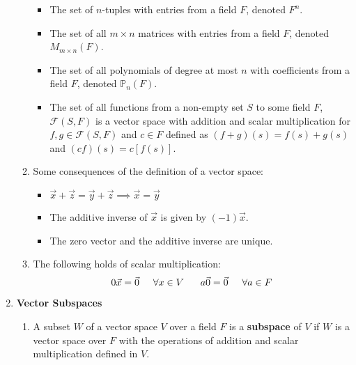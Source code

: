 \documentclass[10pt]{article}
\begin{document}
\begin{multicols*}{2}
\begin{enumerate}
\begin{enumerate}
\begin{itemize}
             \item The set of $n$-tuples with entries from a field $F$, denoted $F^n$.
             
             \item The set of all $m \times n$ matrices with entries from a field $F$, denoted $M_{m \times n} (F)$.
             
             \item The set of all polynomials of degree at most $n$ with coefficients from a field $F$, denoted $\mathbb{P}_n(F)$. 
             
             \item The set of all functions from a non-empty set $S$ to some field $F$, $\mathcal{F}(S,F)$ is a vector space with addition and scalar multiplication for $f,g \in \mathcal{F}(S,F)$ and $c \in F$ defined as $(f+g)(s) = f(s) + g(s)$ and $(cf)(s) = c[f(s)]$.
         \end{itemize}
         
         \item Some consequences of the definition of a vector space:
         \begin{itemize}
             \item $\vec{x} + \vec{z} = \vec{y} + \vec{z} \implies \vec{x} = \vec{y}$
             \item The additive inverse of $\vec{x}$ is given by $(-1)\vec{x}$.
             \item The zero vector and the additive inverse are unique.
         \end{itemize}
         \item The following holds of scalar multiplication: $$0\vec{x} = \vec{0} \hspace{5mm} \forall x \in V \hspace{6mm}
             a\vec{0} = \vec{0} \hspace{5mm} \forall a \in F$$

    \end{enumerate}
    
    \item \textbf{Vector Subspaces}
    \begin{enumerate}
        \item A subset $W$ of a vector space $V$ over a field $F$ is a \textbf{subspace} of $V$ if $W$ is a vector space over $F$ with the operations of addition and scalar multiplication defined in $V$.
        

\end{enumerate}
\end{enumerate}
\end{multicols*}
\end{document}
